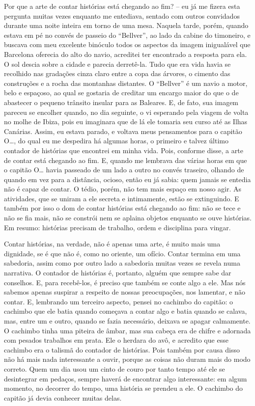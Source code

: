 Por que a arte de contar histórias está chegando ao fim? -- eu já me
fizera esta pergunta muitas vezes enquanto me entediava, sentado com
outros convidados durante uma noite inteira em torno de uma mesa.
Naquela tarde, porém, quando estava em pé no convés de passeio do
``Bellver'', ao lado da cabine do timoneiro, e buscava com meu excelente
binóculo todos os aspectos da imagem inigualável que Barcelona oferecia
do alto do navio, acreditei ter encontrado a resposta para ela. O sol
descia sobre a cidade e parecia derretê-la. Tudo que era vida havia se
recolhido nas gradações cinza claro entre a copa das árvores, o cimento
das construções e a rocha das montanhas distantes. O ``Bellver'' é um
navio a motor, belo e espaçoso, ao qual se gostaria de creditar um
encargo maior do que o de abastecer o pequeno trânsito insular para as
Baleares. E, de fato, sua imagem pareceu se encolher quando, no dia
seguinte, o vi esperando pela viagem de volta no molhe de Ibiza, pois eu
imaginara que de lá ele tomaria seu curso até as Ilhas Canárias. Assim,
eu estava parado, e voltava meus pensamentos para o capitão O\ldots{}, do
qual eu me despedira há algumas horas, o primeiro e talvez último
contador de histórias que encontrei em minha vida. Pois, conforme disse,
a arte de contar está chegando ao fim. E, quando me lembrava das várias
horas em que o capitão O\ldots{} havia passeado de um lado a outro no convés
traseiro, olhando de quando em vez para a distância, ocioso, então eu já
sabia: quem jamais se entedia não é capaz de contar. O tédio, porém, não
tem mais espaço em nosso agir. As atividades, que se uniram a ele
secreta e intimamente, estão se extinguindo. E também por isso o dom de
contar histórias está chegando ao fim: não se tece e não se fia mais,
não se constrói nem se aplaina objetos enquanto se ouve histórias. Em
resumo: histórias precisam de trabalho, ordem e disciplina para vingar.

Contar histórias, na verdade, não é apenas uma arte, é muito mais uma
dignidade, se é que não é, como no oriente, um ofício. Contar termina em
uma sabedoria, assim como por outro lado a sabedoria muitas vezes se
revela numa narrativa. O contador de histórias é, portanto, alguém que
sempre sabe dar conselhos. E, para recebê-los, é preciso que também se
conte algo a ele. Mas nós sabemos apenas suspirar a respeito de nossas
preocupações, nos lamentar, e não contar. E, lembrando um terceiro
aspecto, pensei no cachimbo do capitão: o cachimbo que ele batia quando
começava a contar algo e batia quando se calava, mas, entre um e outro,
quando se fazia necessário, deixava se apagar calmamente. O cachimbo
tinha uma piteira de âmbar, mas sua cabeça era de chifre e adornada com
pesados trabalhos em prata. Ele o herdara do avô, e acredito que esse
cachimbo era o talismã do contador de histórias. Pois também por causa
disso não há mais nada interessante a ouvir, porque as coisas não duram
mais do modo correto. Quem um dia usou um cinto de couro por tanto tempo
até ele se desintegrar em pedaços, sempre haverá de encontrar algo
interessante: em algum momento, no decorrer do tempo, uma história se
prendeu a ele. O cachimbo do capitão já devia conhecer muitas delas.

